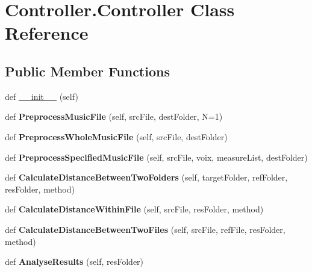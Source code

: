 \hypertarget{class_controller_1_1_controller}{}\section{Controller.\+Controller Class Reference}
\label{class_controller_1_1_controller}
\subsection*{Public Member Functions}
\begin{DoxyCompactItemize}
\item 
def \mbox{\hyperlink{class_controller_1_1_controller_ae584317363efa29ace5c4294ff9675a2}{\+\_\+\+\_\+init\+\_\+\+\_\+}} (self)
\item 
\mbox{\label{class_controller_1_1_controller_aecbb8803d07a48479dd08a2ce2c5e63b}} 
def {\bfseries Preprocess\+Music\+File} (self, src\+File, dest\+Folder, N=1)
\item 
\mbox{\label{class_controller_1_1_controller_a284a977b43420c4d0857c005ef97ee96}} 
def {\bfseries Preprocess\+Whole\+Music\+File} (self, src\+File, dest\+Folder)
\item 
\mbox{\label{class_controller_1_1_controller_a56d24c7bb1adc83017ef250999cc0fac}} 
def {\bfseries Preprocess\+Specified\+Music\+File} (self, src\+File, voix, measure\+List, dest\+Folder)
\item 
\mbox{\label{class_controller_1_1_controller_aa4d51ff1e6597c29fbb5d2eb88c9de58}} 
def {\bfseries Calculate\+Distance\+Between\+Two\+Folders} (self, target\+Folder, ref\+Folder, res\+Folder, method)
\item 
\mbox{\label{class_controller_1_1_controller_a1c468ea03b90ee52ad95622e9cd43796}} 
def {\bfseries Calculate\+Distance\+Within\+File} (self, src\+File, res\+Folder, method)
\item 
\mbox{\label{class_controller_1_1_controller_a1c31afe5e4b38f50a933c728a9bce20e}} 
def {\bfseries Calculate\+Distance\+Between\+Two\+Files} (self, src\+File, ref\+File, res\+Folder, method)
\item 
\mbox{\label{class_controller_1_1_controller_a488ac973d6c7371ec57f92713768d42e}} 
def {\bfseries Analyse\+Results} (self, res\+Folder)
\end{DoxyCompactItemize}
